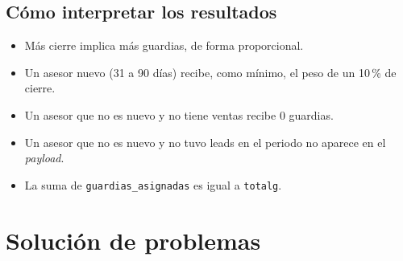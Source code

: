 \documentclass[11pt,a4paper]{article}
\newcommand{\code}[1]{\texttt{#1}}
\begin{document}
\subsection{Cómo interpretar los resultados}
\begin{itemize}[nosep]
  \item Más cierre implica más guardias, de forma proporcional.
  \item Un asesor nuevo (31 a 90 días) recibe, como mínimo, el peso de un 10\,\% de cierre.
  \item Un asesor que no es nuevo y no tiene ventas recibe 0 guardias.
  \item Un asesor que no es nuevo y no tuvo leads en el periodo no aparece en el \emph{payload}.
  \item La suma de \code{guardias\_asignadas} es igual a \code{totalg}.
\end{itemize}

\section{Solución de problemas}
\end{document}
